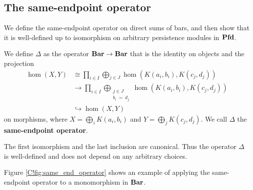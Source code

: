 \subsection{The same-endpoint operator}
\label{C!sec:block_functor}

We define the same-endpoint operator on direct sums of bars, and then show that it is well-defined up to isomorphism on arbitrary persistence modules in $\Pfd$.

\begin{definition}
\label{C!D:Delta}
  We define $\Delta$ as the operator $\Bar \to \Bar$ that is the identity on objects and the projection
  \begin{align*}
    \hom(X, Y) & \cong \prod_{i \in I} \bigoplus_{j \in J} \hom(K(a_i, b_i), K(c_j, d_j)) \\
    & \longrightarrow \prod_{i \in I} \bigoplus_{\substack{j \in J \\ b_i \: = \: d_j}} \hom(K(a_i, b_i), K(c_j, d_j)) \\
    & \hookrightarrow \hom(X, Y)
  \end{align*}
  on morphisms, where $X = \bigoplus_i K(a_i, b_i)$ and $Y = \bigoplus_j K(c_j, d_j)$. We call $\Delta$ the \textbf{same-endpoint operator}.
\end{definition}

\begin{remark}
  The first isomorphism and the last inclusion are canonical. Thus the operator $\Delta$ is well-defined and does not depend on any arbitrary choices.
\end{remark}

\begin{example}
  Figure \ref{C!fig:same_end_operator} shows an example of applying the same-endpoint operator to a monomorphism in $\Bar$.
\end{example}

